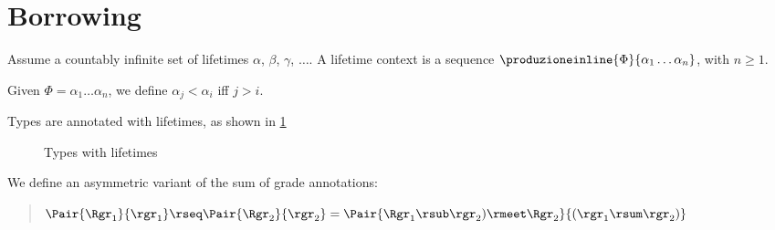 \section{Borrowing}

Assume a countably infinite set of lifetimes $\alpha$, $\beta$, $\gamma$, $\ldots$.
A lifetime context is a sequence $\produzioneinline{\Phi}{\alpha_1\ldots\alpha_n}$, with $n\geq 1$.

Given $\Phi=\alpha_1\ldots\alpha_n$, we define $\alpha_j < \alpha_i$ iff $j > i$. 

Types are annotated with lifetimes, as shown in \cref{fig:types-lt}

\begin{figure}
\begin{grammatica}
\end{grammatica}
\caption{Types with lifetimes}\label{fig:types-lt}
\end{figure}

We define an asymmetric variant of the sum of grade annotations:

\begin{quote}
$\Pair{\Rgr_1}{\rgr_1}\rseq\Pair{\Rgr_2}{\rgr_2}=\Pair{\Rgr_1 \rsub \rgr_2) \rmeet \Rgr_2}{(\rgr_1\rsum\rgr_2)}$
\end{quote}

